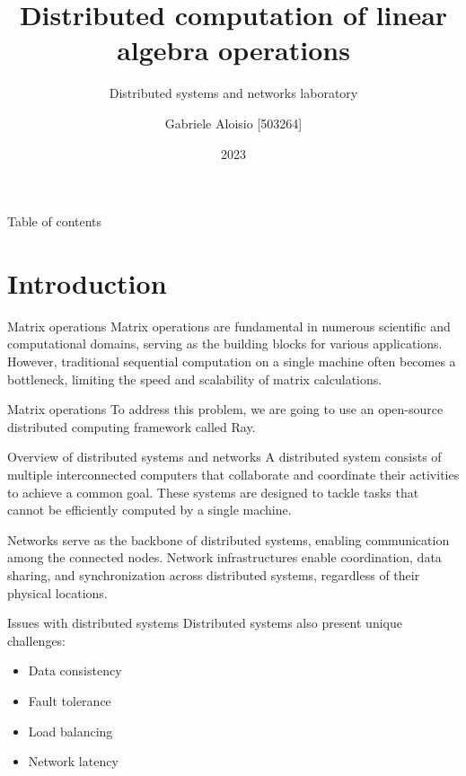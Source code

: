 \documentclass{beamer}
\title{Distributed computation of linear algebra operations}
\subtitle{Distributed systems and networks laboratory}
\author{Gabriele Aloisio [503264]}
\institute{Università degli studi di Messina}
\date{2023}
\begin{document}
\maketitle

\begin{frame}{Table of contents}
    \tableofcontents
\end{frame}

\section{Introduction}
\begin{frame}{Matrix operations}
    Matrix operations are fundamental in numerous scientific and computational domains, serving as the building blocks for various applications. However, traditional sequential computation on a single machine often becomes a bottleneck, limiting the speed and scalability of matrix calculations.
\end{frame}

\begin{frame}{Matrix operations}
    To address this problem, we are going to use an open-source distributed computing framework called \alert{Ray}.
\end{frame}

\begin{frame}{Overview of distributed systems and networks}
    A \alert{distributed system} consists of multiple interconnected computers that collaborate and coordinate their activities to achieve a common goal. These systems are designed to tackle  tasks that cannot be efficiently computed by a single machine.

    \alert{Networks} serve as the backbone of distributed systems, enabling communication among the connected nodes. Network infrastructures enable coordination, data sharing, and synchronization across distributed systems, regardless of their physical locations.
\end{frame}


\begin{frame}{Issues with distributed systems}
    Distributed systems also present unique challenges:
    \begin{itemize}
        \item{Data consistency}
        \item {Fault tolerance}
        \item {Load balancing}
        \item {Network latency}
    \end{itemize}
\end{frame}
\end{document}
